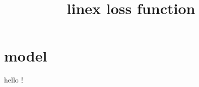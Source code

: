 \documentclass{article}
\begin{document}
	
	
	\title{linex loss function}
	\author{}
	\date{}
	\maketitle
	
	
	\section{model}
	hello！
	
	
	
\end{document}
